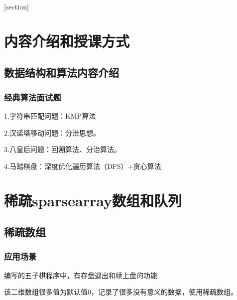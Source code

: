 \documentclass[a4paper]{report}
\begin{document}
\flushbottom%
\newcommand{\dm}[1]{\colorbox{wgray}{\lstinline`#1`}}
\newcommand{\myroman}[1]{\uppercase\expandafter{\romannumeral#1}}
[section] \renewcommand{\thenum}{\arabic{num}.} \newcommand{\num}{\refstepcounter{num}\text{\thenum}}

\newenvironment{tips}{\kaishu\zihao{-6}\color{blue}{\noindent\rule[-3pt]{\textwidth}{0.5pt}\par \em \noindent {\zihao{-5} \textcolor[rgb]{1.00,0.00,0.00}{Tips}}}\par}{\\ \rule[1mm]{\textwidth}{0.5pt}\par}

\newenvironment{zhengming}{\kaishu\zihao{-5}\color{blue}{\noindent\em 证明：}\par}{\hfill $\diamondsuit$\par}

\tableofcontents
{}%
\clearpage
{}%
\chapter{内容介绍和授课方式}
\section{数据结构和算法内容介绍}
\subsection{经典算法面试题}
1.字符串匹配问题：KMP算法

2.汉诺塔移动问题：分治思想。

3.八皇后问题：回溯算法、分治算法。

4.马踏棋盘：深度优化遍历算法（DFS）+贪心算法

\chapter{稀疏sparsearray数组和队列}
\section{稀疏数组}
\subsection{应用场景}

编写的五子棋程序中，有存盘退出和续上盘的功能

该二维数组很多值为默认值0，记录了很多没有意义的数据，使用稀疏数组。
\end{document}
